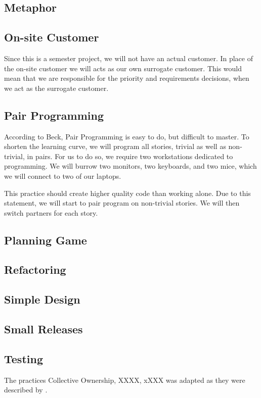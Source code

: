 \subsection{Metaphor}


\subsection{On-site Customer}
Since this is a semester project, we will not have an actual customer.
In place of the on-site customer we will acts as our own surrogate customer.
This would mean that we are responsible for the priority and requirements decisions, when we act as the surrogate customer.

\subsection{Pair Programming}
According to Beck, Pair Programming is easy to do, but difficult to master.
To shorten the learning curve, we will program all stories, trivial as well as non-trivial, in pairs.
For us to do so, we require two workstations dedicated to programming.
We will burrow two monitors, two keyboards, and two mice, which we will connect to two of our laptops.








This practice should create higher quality code than working alone.
Due to this statement, we will start to pair program on non-trivial stories.
We will then switch partners for each story. 

\subsection{Planning Game}


\subsection{Refactoring}


\subsection{Simple Design}


\subsection{Small Releases}


\subsection{Testing}




The practices 
Collective Ownership, 
XXXX, 
xXXX
was adapted as they were described by \cite{Beck}.
